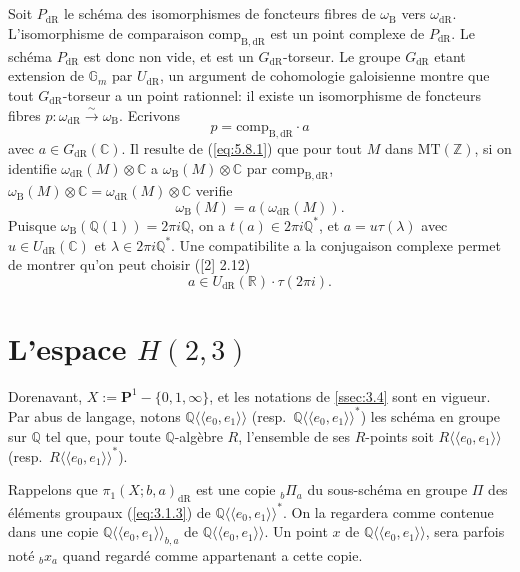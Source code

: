 \documentclass[11pt,a4paper]{article}
\theoremstyle{plain}
\theoremstyle{definition}
\newcommand{\Z}{\mathbb{Z}}
\newcommand{\Q}{\mathbb{Q}}
\newcommand{\R}{\mathbb{R}}
\newcommand{\C}{\mathbb{C}}
\newcommand{\Gm}{\mathbb{G}_m}
\newcommand{\dR}{\mathrm{dR}}
\newcommand{\B}{\mathrm{B}}
\newcommand{\comp}{\mathrm{comp}}
\newcommand{\MT}{\mathrm{MT}}
\begin{document}
\subsection{}\label{ssec:5.8}

Soit $P_{\dR}$ le sch\'ema des isomorphismes de foncteurs fibres de $\omega_{\B}$ vers $\omega_{\dR}$. L'isomorphisme de comparaison $\comp_{\B,\dR}$ est un point complexe de $P_{\dR}$. Le sch\'ema $P_{\dR}$ est donc non vide, et est un $G_{\dR}$-torseur. Le groupe $G_{\dR}$ etant extension de $\Gm$ par $U_{\dR}$, un argument de cohomologie galoisienne montre que tout $G_{\dR}$-torseur a un point rationnel: il existe un isomorphisme de foncteurs fibres $p: \omega_{\dR} \xrightarrow{\sim} \omega_{\B}$. Ecrivons
\begin{equation}\label{eq:5.8.1}
p = \comp_{\B,\dR} \cdot a
\end{equation}
avec $a \in G_{\dR}(\C)$. Il resulte de (\ref{eq:5.8.1}) que pour tout $M$ dans $\MT(\Z)$, si on identifie $\omega_{\dR}(M) \otimes \C$ a $\omega_{\B}(M) \otimes \C$ par $\comp_{\B,\dR}$, $\omega_{\B}(M) \otimes \C = \omega_{\dR}(M) \otimes \C$ verifie
\begin{equation}\label{eq:5.8.2}
\omega_{\B}(M) = a(\omega_{\dR}(M)).
\end{equation}
Puisque $\omega_{\B}(\Q(1)) = 2\pi i \Q$, on a $t(a) \in 2\pi i \Q^*$, et $a = u \tau(\lambda)$ avec $u \in U_{\dR}(\C)$ et $\lambda \in 2\pi i \Q^*$. Une compatibilite a la conjugaison complexe permet de montrer qu'on peut choisir ([2] 2.12)
\begin{equation}\label{eq:5.8.3}
a \in U_{\dR}(\R) \cdot \tau(2\pi i).
\end{equation}

\section{L'espace $H(2,3)$}\label{sec:6}

Dorenavant, $X := \mathbf{P}^1 - \{0,1,\infty\}$, et les notations de \ref{ssec:3.4} sont en vigueur. Par abus de langage, notons $\Q\langle\langle e_0,e_1 \rangle\rangle$ (resp.~$\Q\langle\langle e_0,e_1 \rangle\rangle^*$) les sch\'ema en groupe sur $\Q$ tel que, pour toute $\Q$-alg\`ebre $R$, l'ensemble de ses $R$-points soit $R\langle\langle e_0,e_1 \rangle\rangle$ (resp.~$R\langle\langle e_0,e_1 \rangle\rangle^*$).

Rappelons que $\pi_1(X;b,a)_{\dR}$ est une copie ${}_b\Pi_a$ du sous-sch\'ema en groupe $\Pi$ des \'el\'ements groupaux (\ref{eq:3.1.3}) de $\Q\langle\langle e_0,e_1 \rangle\rangle^*$. On la regardera comme contenue dans une copie $\Q\langle\langle e_0,e_1 \rangle\rangle_{b,a}$ de $\Q\langle\langle e_0,e_1 \rangle\rangle$. Un point $x$ de $\Q\langle\langle e_0,e_1 \rangle\rangle$, sera parfois not\'e ${}_b x_a$ quand regard\'e comme appartenant a cette copie.
\end{document}
